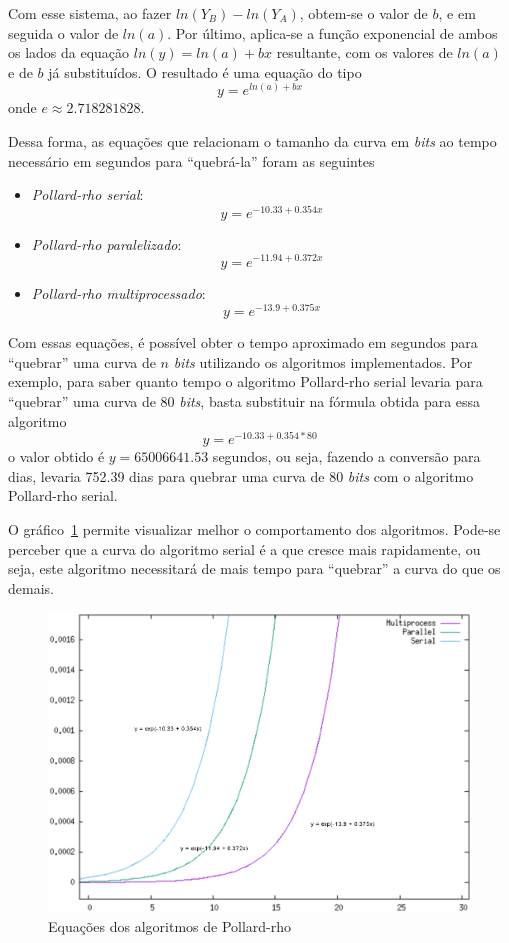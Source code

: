 Com esse sistema, ao fazer \(ln(Y_B) - ln(Y_A)\), obtem-se o valor de \(b\), e em seguida o valor de \(ln(a)\). Por último, aplica-se a função exponencial de ambos os lados da equação \(ln(y) = ln(a) + bx\) resultante, com os valores de \(ln(a)\) e de \(b\) já substituídos. O resultado é uma equação do tipo
$$
	y = e^{ln(a) + bx}
$$
onde \(e \approx 2.718281828\).

Dessa forma, as equações que relacionam o tamanho da curva em \textit{bits} ao tempo necessário em segundos para ``quebrá-la'' foram as seguintes
\begin{itemize}
	\item \textit{Pollard-rho serial}: $$y = e^{-10.33 + 0.354x}$$
	\item \textit{Pollard-rho paralelizado}: $$y = e^{-11.94 + 0.372x}$$
	\item \textit{Pollard-rho multiprocessado}: $$y = e^{-13.9 + 0.375x}$$
\end{itemize}

Com essas equações, é possível obter o tempo aproximado em segundos para ``quebrar'' uma curva de \(n\) \textit{bits} utilizando os algoritmos implementados. Por exemplo, para saber quanto tempo o algoritmo Pollard-rho serial levaria para ``quebrar'' uma curva de 80 \textit{bits}, basta substituir na fórmula obtida para essa algoritmo
$$
	y = e^{-10.33 + 0.354*80}
$$
o valor obtido é \(y = 65006641.53\) segundos, ou seja, fazendo a conversão para dias, levaria 752.39 dias para quebrar uma curva de 80 \textit{bits} com o algoritmo Pollard-rho serial.

O gráfico~\ref{eq_graph} permite visualizar melhor o comportamento dos algoritmos. Pode-se perceber que a curva do algoritmo serial é a que cresce mais rapidamente, ou seja, este algoritmo necessitará de mais tempo para ``quebrar'' a curva do que os demais.

\begin{figure}
\centering
\includegraphics[scale=0.6, bb=0 0 515 478]{figuras/pollard_formulas.eps}
\caption{Equações dos algoritmos de Pollard-rho}
\label{eq_graph}
\end{figure}

